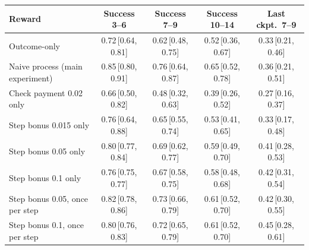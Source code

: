 \begin{tabular}{lcccc}
\toprule
Reward & Success 3--6 & Success 7--9 & Success 10--14 & Last ckpt.\ 7--9 \\
\midrule
Outcome-only & 0.72\,{\scriptsize[0.64, 0.81]} & 0.62\,{\scriptsize[0.48, 0.75]} & 0.52\,{\scriptsize[0.36, 0.67]} & 0.33\,{\scriptsize[0.21, 0.46]} \\
Naive process (main experiment) & 0.85\,{\scriptsize[0.80, 0.91]} & 0.76\,{\scriptsize[0.64, 0.87]} & 0.65\,{\scriptsize[0.52, 0.78]} & 0.36\,{\scriptsize[0.21, 0.51]} \\
Check payment 0.02 only & 0.66\,{\scriptsize[0.50, 0.82]} & 0.48\,{\scriptsize[0.32, 0.63]} & 0.39\,{\scriptsize[0.26, 0.52]} & 0.27\,{\scriptsize[0.16, 0.37]} \\
Step bonus 0.015 only & 0.76\,{\scriptsize[0.64, 0.88]} & 0.65\,{\scriptsize[0.55, 0.74]} & 0.53\,{\scriptsize[0.41, 0.65]} & 0.33\,{\scriptsize[0.17, 0.48]} \\
Step bonus 0.05 only & 0.80\,{\scriptsize[0.77, 0.84]} & 0.69\,{\scriptsize[0.62, 0.77]} & 0.59\,{\scriptsize[0.49, 0.70]} & 0.41\,{\scriptsize[0.28, 0.53]} \\
Step bonus 0.1 only & 0.76\,{\scriptsize[0.75, 0.77]} & 0.67\,{\scriptsize[0.58, 0.75]} & 0.58\,{\scriptsize[0.48, 0.68]} & 0.42\,{\scriptsize[0.31, 0.54]} \\
Step bonus 0.05, once per step & 0.82\,{\scriptsize[0.78, 0.86]} & 0.73\,{\scriptsize[0.66, 0.79]} & 0.61\,{\scriptsize[0.52, 0.70]} & 0.42\,{\scriptsize[0.30, 0.55]} \\
Step bonus 0.1, once per step & 0.80\,{\scriptsize[0.76, 0.83]} & 0.72\,{\scriptsize[0.65, 0.79]} & 0.61\,{\scriptsize[0.52, 0.70]} & 0.45\,{\scriptsize[0.28, 0.61]} \\
\bottomrule
\end{tabular}
